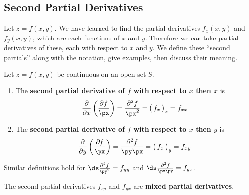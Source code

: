 \subsection{Second Partial Derivatives}

Let $z=f(x,y)$. We have learned to find the partial derivatives $f_x(x,y)$ and $f_y(x,y)$, which are each functions of $x$ and $y$. Therefore we can take partial derivatives of these, each with respect to $x$ and $y$. We define these ``second partials'' along with the notation, give examples, then discuss their meaning.

{Let $z=f(x,y)$ be continuous on an open set $S$.
\begin{enumerate}
	\item The \textbf{second partial derivative of $f$ with respect to $x$ then $x$} is
	\[\frac{\partial}{\partial x}\left(\frac{\partial f}{\px}\right) = \frac{\partial^2 f}{\px^2} = \big(\,f_x\,\big)_x = f_{xx}\]

\item The \textbf{second partial derivative of $f$ with respect to $x$ then $y$} is 
\[\frac{\partial}{\partial y}\left(\frac{\partial f}{\px}\right) = \frac{\partial^2f}{\py\px} = \big(\,f_x\,\big)_y = f_{xy}\]

%

\end{enumerate}

Similar definitions hold for $\ds \frac{\partial^2f}{\py^2} = f_{yy}$ and $\ds \frac{\partial^2f}{\px\py} = f_{yx}$. \bigskip

The second partial derivatives $f_{xy}$ and $f_{yx}$ are \textbf{mixed partial derivatives}.
}


